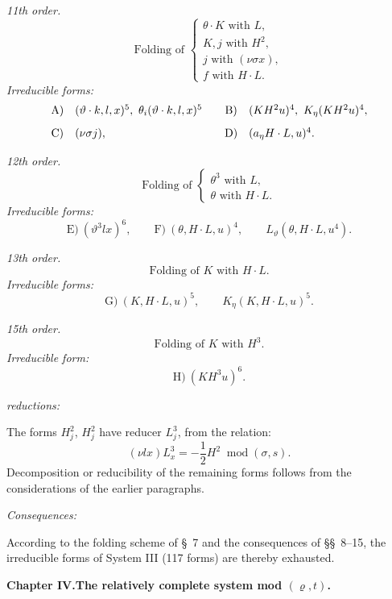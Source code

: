 \documentclass[11pt]{article}
\newcommand{\modu}[1]{\;\operatorname{mod} #1}
\providecommand{\modu}[1]{\;\operatorname{mod} #1}
\begin{document}
\noindent\emph{11th order.}
\[
\text{Folding of }\left\{\begin{array}{l}
\theta\cdot K\text{ with }L,\\
K,j\text{ with }H^2,\\
j\text{ with }(\nu\sigma x),\\
f\text{ with }H\cdot L.
\end{array}\right.
\]
\noindent\emph{Irreducible forms:}
\[
\begin{array}{c@{\quad}l@{\qquad}c@{\quad}l}
\text{A)}&(\vartheta\cdot k,l,x)^5,
\ \theta_i(\vartheta\cdot k,l,x)^5&
\text{B)}&(KH^2u)^4,
\ K_\eta(KH^2u)^4,\\[0.8em]
\text{C)}&(\nu\sigma j),&
\text{D)}&(a_\eta H\cdot L,u)^4.
\end{array}
\]

\noindent\emph{12th order.}
\[
\text{Folding of }\left\{\begin{array}{l}
\theta^3\text{ with }L,\\
\theta\text{ with }H\cdot L.
\end{array}\right.
\]
\noindent\emph{Irreducible forms:}
\[
\text{E)}\ (\vartheta^3lx)^6,
\qquad
\text{F)}\ (\theta,H\cdot L,u)^4,
\qquad L_\vartheta(\theta,H\cdot L,u^4).
\]

\noindent\emph{13th order.}
\[
\text{Folding of }K\text{ with }H\cdot L.
\]
\noindent\emph{Irreducible forms:}
\[
\text{G)}\ (K,H\cdot L,u)^5,
\qquad K_\eta(K,H\cdot L,u)^5.
\]

\noindent\emph{15th order.}
\[
\text{Folding of }K\text{ with }H^3.
\]
\noindent\emph{Irreducible form:}
\[
\text{H)}\ (KH^3u)^6.
\]

\noindent\emph{reductions:}

The forms $H_j^2$, $H_j^2$ have reducer $L_j^3$, from the relation:
\[
(\nu lx)L_x^3=-\frac12H^2\modu{(\sigma,s)}.
\]
Decomposition or reducibility of the remaining forms follows from the considerations of the earlier paragraphs.

\noindent\emph{Consequences:}

According to the folding scheme of \S\ 7 and the consequences of \S\S\ 8--15, the irreducible forms of System III (117 forms) are thereby exhausted.



\clearpage

\begin{center}
{\Large\bfseries Chapter IV.\quad The relatively complete system mod $(\varrho,t)$.}
\end{center}
\end{document}
